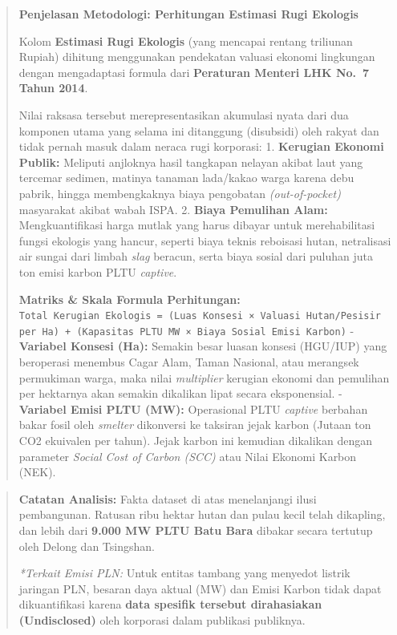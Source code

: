 \documentclass[
]{article}
\begin{document}
\begin{quote}
\textbf{Penjelasan Metodologi: Perhitungan Estimasi Rugi Ekologis}

Kolom \textbf{Estimasi Rugi Ekologis} (yang mencapai rentang triliunan
Rupiah) dihitung menggunakan pendekatan valuasi ekonomi lingkungan
dengan mengadaptasi formula dari \textbf{Peraturan Menteri LHK No.~7
Tahun 2014}.

Nilai raksasa tersebut merepresentasikan akumulasi nyata dari dua
komponen utama yang selama ini ditanggung (disubsidi) oleh rakyat dan
tidak pernah masuk dalam neraca rugi korporasi: 1. \textbf{Kerugian
Ekonomi Publik:} Meliputi anjloknya hasil tangkapan nelayan akibat laut
yang tercemar sedimen, matinya tanaman lada/kakao warga karena debu
pabrik, hingga membengkaknya biaya pengobatan \emph{(out-of-pocket)}
masyarakat akibat wabah ISPA. 2. \textbf{Biaya Pemulihan Alam:}
Mengkuantifikasi harga mutlak yang harus dibayar untuk merehabilitasi
fungsi ekologis yang hancur, seperti biaya teknis reboisasi hutan,
netralisasi air sungai dari limbah \emph{slag} beracun, serta biaya
sosial dari puluhan juta ton emisi karbon PLTU \emph{captive}.

\textbf{Matriks \& Skala Formula Perhitungan:}
\texttt{Total\ Kerugian\ Ekologis\ =\ (Luas\ Konsesi\ ×\ Valuasi\ Hutan/Pesisir\ per\ Ha)\ +\ (Kapasitas\ PLTU\ MW\ ×\ Biaya\ Sosial\ Emisi\ Karbon)}
- \textbf{Variabel Konsesi (Ha):} Semakin besar luasan konsesi (HGU/IUP)
yang beroperasi menembus Cagar Alam, Taman Nasional, atau merangsek
permukiman warga, maka nilai \emph{multiplier} kerugian ekonomi dan
pemulihan per hektarnya akan semakin dikalikan lipat secara
eksponensial. - \textbf{Variabel Emisi PLTU (MW):} Operasional PLTU
\emph{captive} berbahan bakar fosil oleh \emph{smelter} dikonversi ke
taksiran jejak karbon (Jutaan ton CO2 ekuivalen per tahun). Jejak karbon
ini kemudian dikalikan dengan parameter \emph{Social Cost of Carbon
(SCC)} atau Nilai Ekonomi Karbon (NEK).
\end{quote}

\begin{quote}
\textbf{Catatan Analisis:} Fakta dataset di atas menelanjangi ilusi
pembangunan. Ratusan ribu hektar hutan dan pulau kecil telah dikapling,
dan lebih dari \textbf{9.000 MW PLTU Batu Bara} dibakar secara tertutup
oleh Delong dan Tsingshan.

\emph{*Terkait Emisi PLN:} Untuk entitas tambang yang menyedot listrik
jaringan PLN, besaran daya aktual (MW) dan Emisi Karbon tidak dapat
dikuantifikasi karena \textbf{data spesifik tersebut dirahasiakan
(Undisclosed)} oleh korporasi dalam publikasi publiknya.
\end{quote}
\end{document}
